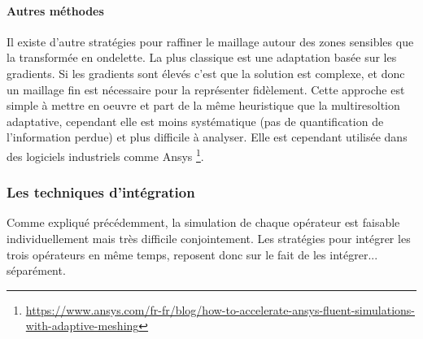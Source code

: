        \paragraph{Autres méthodes}
        Il existe d'autre stratégies pour raffiner le maillage autour des zones sensibles que la transformée en ondelette. 
        La plus classique est une adaptation basée sur les gradients. Si les gradients sont élevés c'est que la solution est complexe,
        et donc un maillage fin est nécessaire pour la représenter fidèlement. Cette approche est simple à mettre en oeuvre et part de la même heuristique 
        que la multiresoltion adaptative, cependant elle est moins systématique (pas de quantification de l'information perdue) et plus difficile à analyser. 
        Elle est cependant utilisée dans des logiciels industriels comme Ansys 
        \footnote{\href{https://www.ansys.com/fr-fr/blog/how-to-accelerate-ansys-fluent-simulations-with-adaptive-meshing}{https://www.ansys.com/fr-fr/blog/how-to-accelerate-ansys-fluent-simulations-with-adaptive-meshing}}.

    \subsubsection{Les techniques d'intégration}
        Comme expliqué précédemment, la simulation de chaque opérateur est faisable individuellement mais très difficile conjointement.
        Les stratégies pour intégrer les trois opérateurs en même temps, reposent donc sur le fait de les intégrer... séparément.

